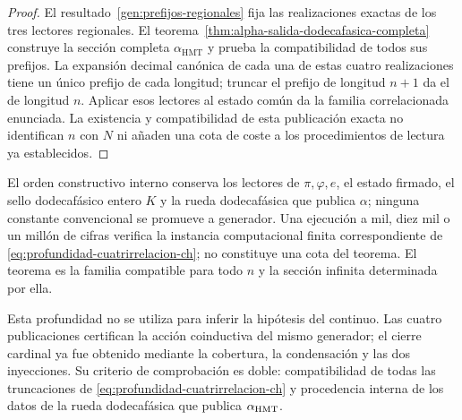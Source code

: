 \begin{proof}
El resultado~\ref{gen:prefijos-regionales} fija las realizaciones exactas
de los tres lectores regionales. El
teorema~\ref{thm:alpha-salida-dodecafasica-completa} construye la sección
completa \(\alpha_{\mathrm{HMT}}\) y prueba la compatibilidad de todos sus
prefijos. La expansión decimal canónica de cada una de estas
cuatro realizaciones tiene un único prefijo de cada longitud; truncar el
prefijo de longitud \(n+1\) da el de longitud \(n\). Aplicar esos lectores
al estado común da la familia correlacionada enunciada. La existencia y
compatibilidad de esta publicación exacta no identifican \(n\) con \(N\)
ni añaden una cota de coste a los procedimientos de lectura ya establecidos.
\end{proof}

El orden constructivo interno conserva los lectores de
\(\pi,\varphi,e\), el estado firmado, el sello dodecafásico entero \(K\) y la rueda
dodecafásica que publica \(\alpha\); ninguna constante convencional se
promueve a generador. Una ejecución a mil, diez mil o un millón de cifras
verifica la instancia computacional finita correspondiente de
\eqref{eq:profundidad-cuatrirrelacion-ch}; no constituye una cota del
teorema. El teorema es la familia compatible para todo \(n\) y la sección
infinita determinada por ella.

Esta profundidad no se utiliza para inferir la hipótesis del continuo. Las cuatro publicaciones
certifican la acción coinductiva del mismo generador; el cierre cardinal ya fue
obtenido mediante la cobertura, la condensación y las dos inyecciones. Su
criterio de comprobación es doble: compatibilidad de todas las truncaciones
de \eqref{eq:profundidad-cuatrirrelacion-ch} y procedencia interna de los
datos de la rueda dodecafásica que publica \(\alpha_{\rm HMT}\).

